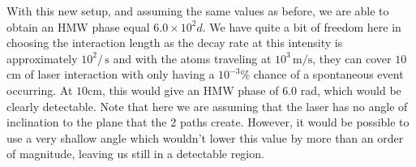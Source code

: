 \documentclass[twocolumn,english,pra,aps,superscriptaddress,floatfix]{revtex4-1}
\begin{document}
With this new setup, and assuming the same values as before, we are able to obtain an HMW phase equal $6.0\times 10^2d$.  We have quite a bit of freedom here in choosing the interaction length as the decay rate at this intensity is approximately $10^{2}/\,\mathrm{s}$ and with the atoms traveling at $10^3\,\mathrm{m/s}$, they can cover $10$ cm of laser interaction with only having a $10^{-3}\%$ chance of a spontaneous event occurring.  
At $10$cm, this would give an HMW phase of $6.0$ rad, which would be clearly detectable.  Note that here we are assuming that the laser has no angle of inclination to the plane that the 2 paths create.  However, it would be possible to use a very shallow angle which wouldn't lower this value by more than an order of magnitude, leaving us still in a detectable region. 
\vspace{5mm}
\end{document}

